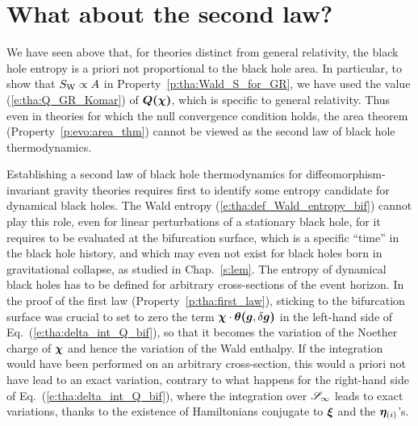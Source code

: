 \section{What about the second law?}

We have seen above that, for theories distinct from general relativity,
the black hole entropy is a priori not proportional to the black hole area.
In particular, to show that $S_{\rm W} \propto A$ in Property~\ref{p:tha:Wald_S_for_GR},
we have used the value (\ref{e:tha:Q_GR_Komar}) of $\bm{Q}\textbf{(}\bm{\chi}\textbf{)}$,
which is specific to general relativity.
Thus even in theories for which the null convergence condition holds,
the area theorem (Property~\ref{p:evo:area_thm}) cannot be viewed as the
second law of black hole thermodynamics.

Establishing a second law of black hole thermodynamics for diffeomorphism-invariant
gravity theories requires first to identify some entropy candidate for
dynamical black holes. The Wald entropy (\ref{e:tha:def_Wald_entropy_bif})
cannot play this role, even for linear perturbations of a stationary black hole,
for it requires to be evaluated at the bifurcation surface, which is a
specific ``time'' in the black hole history, and which may even not exist
for black holes born in gravitational collapse, as studied in Chap.~\ref{s:lem}.
The entropy of dynamical black holes has to be defined for arbitrary cross-sections of the event horizon. In the proof of the first law (Property~\ref{p:tha:first_law}),
sticking to the bifurcation surface was crucial to set to zero the term
$\bm{\chi}\cdot\bm{\theta}\textbf{(}\bm{g},\delta\bm{g}\textbf{)}$ in the left-hand side of
Eq.~(\ref{e:tha:delta_int_Q_bif}), so that it becomes the variation of
the Noether charge of $\bm{\chi}$ and hence the variation of the Wald enthalpy.
If the integration would have been performed on an arbitrary cross-section,
this would a priori not have lead to an exact variation,
contrary to what happens for the right-hand side of Eq.~(\ref{e:tha:delta_int_Q_bif}),
where the integration over $\mathscr{S}_\infty$ leads to exact variations, thanks to
the existence of Hamiltonians conjugate
to $\bm{\xi}$ and the $\bm{\eta}_{(i)}$'s.

